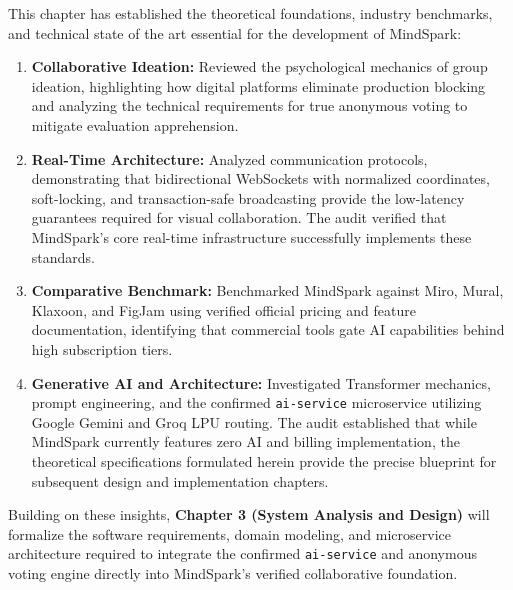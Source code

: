 This chapter has established the theoretical foundations, industry benchmarks, and technical state of the art essential for the development of MindSpark:
\begin{enumerate}
    \item \textbf{Collaborative Ideation:} Reviewed the psychological mechanics of group ideation, highlighting how digital platforms eliminate production blocking and analyzing the technical requirements for true anonymous voting to mitigate evaluation apprehension.
    \item \textbf{Real-Time Architecture:} Analyzed communication protocols, demonstrating that bidirectional WebSockets with normalized coordinates, soft-locking, and transaction-safe broadcasting provide the low-latency guarantees required for visual collaboration. The audit verified that MindSpark's core real-time infrastructure successfully implements these standards.
    \item \textbf{Comparative Benchmark:} Benchmarked MindSpark against Miro, Mural, Klaxoon, and FigJam using verified official pricing and feature documentation, identifying that commercial tools gate AI capabilities behind high subscription tiers.
    \item \textbf{Generative AI and Architecture:} Investigated Transformer mechanics, prompt engineering, and the confirmed \texttt{ai-service} microservice utilizing Google Gemini and Groq LPU routing. The audit established that while MindSpark currently features zero AI and billing implementation, the theoretical specifications formulated herein provide the precise blueprint for subsequent design and implementation chapters.
\end{enumerate}

Building on these insights, \textbf{Chapter 3 (System Analysis and Design)} will formalize the software requirements, domain modeling, and microservice architecture required to integrate the confirmed \texttt{ai-service} and anonymous voting engine directly into MindSpark's verified collaborative foundation.